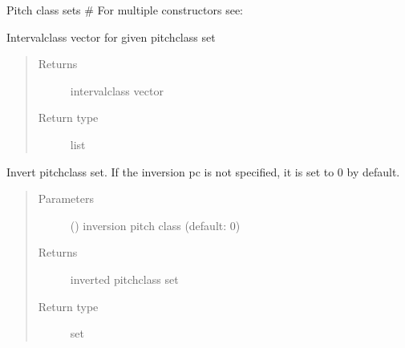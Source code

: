 \documentclass[letterpaper,10pt,english]{sphinxmanual}
\begin{document}
\begin{fulllineitems}
\sphinxAtStartPar
Pitch class sets
\# For multiple constructors see: 


\begin{fulllineitems}
\sphinxAtStartPar
Interval\sphinxhyphen{}class vector for given pitch\sphinxhyphen{}class set
\begin{quote}\begin{description}
\item[{Returns}] \leavevmode
\sphinxAtStartPar
interval\sphinxhyphen{}class vector

\item[{Return type}] \leavevmode
\sphinxAtStartPar
list

\end{description}\end{quote}

\end{fulllineitems}



\begin{fulllineitems}
\sphinxAtStartPar
Invert pitch\sphinxhyphen{}class set. If the inversion pc is not specified, it is set to 0 by default.
\begin{quote}\begin{description}
\item[{Parameters}] \leavevmode
\sphinxAtStartPar
{} () \textendash{} inversion pitch class (default: 0)

\item[{Returns}] \leavevmode
\sphinxAtStartPar
inverted pitch\sphinxhyphen{}class set

\item[{Return type}] \leavevmode
\sphinxAtStartPar
set

\end{description}\end{quote}

\end{fulllineitems}




\end{fulllineitems}
\end{document}
